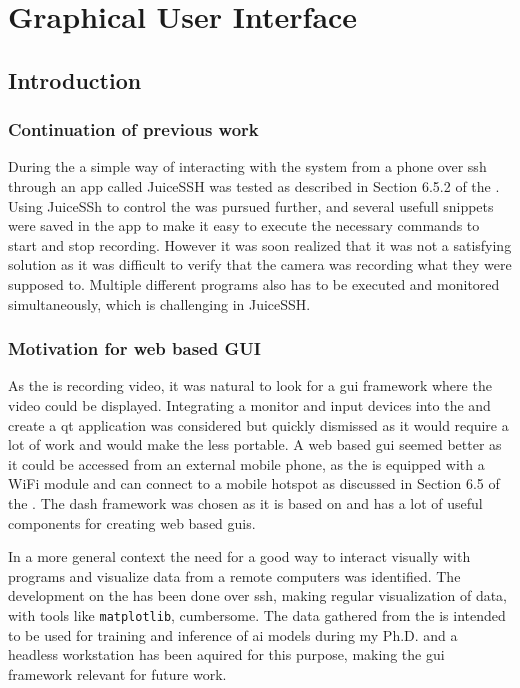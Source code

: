 \chapter{Graphical User Interface}

\section{Introduction}
\subsection{Continuation of previous work}
During the \preproject a simple way of interacting with the system from a phone over \gls{ssh} through an app called JuiceSSH was tested as described in Section 6.5.2 of the \preproject.
Using JuiceSSh to control the \sr was pursued further, and several usefull snippets were saved in the app to make it easy to execute the necessary commands to start and stop recording.
However it was soon realized that it was not a satisfying solution as it was difficult to verify that the camera was recording what they were supposed to.
Multiple different programs also has to be executed and monitored simultaneously, which is challenging in JuiceSSH.


\subsection{Motivation for web based GUI}
As the \sr is recording video, it was natural to look for a \gls{gui} framework where the video could be displayed.
Integrating a monitor and input devices into the \sr and create a \gls{qt} application was considered but quickly dismissed as it would require a lot of work and would make the \sr less portable.
A web based \gls{gui} seemed better as it could be accessed from an external mobile phone, as the \sr is equipped with a WiFi module and can connect to a mobile hotspot as discussed in Section 6.5
of the \preproject.
The \gls{dash} framework was chosen as it is based on \py and has a lot of useful components for creating web based \glspl{gui}.

In a more general context the need for a good way to interact visually with programs and visualize data from a remote computers was identified.
The development on the \jx has been done over \gls{ssh}, making regular visualization of data, with tools like \texttt{matplotlib}, cumbersome.
The data gathered from the \sr is intended to be used for training and inference of \gls{ai} models during my Ph.D. and a headless workstation has been aquired for this purpose, making the \gls{gui} framework relevant for future work.

